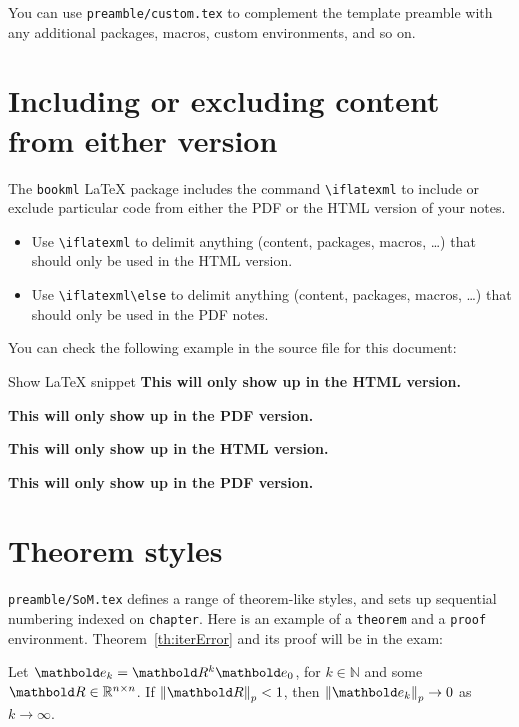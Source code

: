 You can use \verb|preamble/custom.tex| to complement the template preamble with any additional packages, macros, custom environments, and so on.


\section{Including or excluding content from either version}
\label{demo:ifpdf}

The \verb|bookml| \LaTeX{} package includes the command \verb|\iflatexml|  to include or exclude particular code from either the PDF or the HTML version of your notes.

\begin{itemize}
    \item Use \verb|\iflatexml| to delimit anything (content, packages, macros, \ldots) that should only be used in the HTML version.
    \item Use \verb|\iflatexml\else| to delimit anything (content, packages, macros, \ldots) that should only be used in the PDF notes.
\end{itemize}

You can check the following example in the source file for this document:

\begin{snippet}{Show \LaTeX{} snippet}
\iflatexml
  \textbf{This will only show up in the HTML version.}
\fi

\iflatexml
\else
  \textbf{This will only show up in the PDF version.}
\fi
\end{snippet}

\iflatexml
  \textbf{This will only show up in the HTML version.}
\fi

\iflatexml
\else
  \textbf{This will only show up in the PDF version.}
\fi



\section{Theorem styles}
\label{demo:thm}

\verb|preamble/SoM.tex| defines a range of theorem-like styles, and sets up sequential numbering indexed on \verb|chapter|. Here is an example of a \verb|theorem| and a \verb|proof| environment.
Theorem~\ref{th:iterError} and its proof will be in the exam:

\begin{theorem}
  \label{th:iterError}
  Let $\vect{e}_k = \mat{R}^k \vect{e}_0$, for $k\in \mathbb{N}$ and some $\mat{R}\in \R^{n\times n}$. If $\norm{\mat{R}}_p < 1$, then \mbox{$\norm{\vect{e}_k}_p \to 0$} as $k \to \infty$.
\end{theorem}

